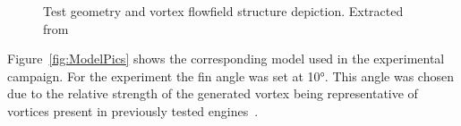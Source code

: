 \documentclass{AIAA}
\begin{document}
\begin{figure}[h]
\center
\caption{Test geometry and vortex flowfield structure depiction. Extracted from~\cite{JSASS_paper}}  
\label{fig:Vortex_Sketches}	
\end{figure}


\hfill\newline


Figure~\ref{fig:ModelPics} shows the corresponding model used in the experimental campaign.
For the experiment the fin angle was set at \ang{10}.
This angle was chosen due to the relative strength of the generated vortex being representative of vortices present in previously tested engines~\cite{AFMCpaper2014,SpacePlanes_paper2015}.
\end{document}
